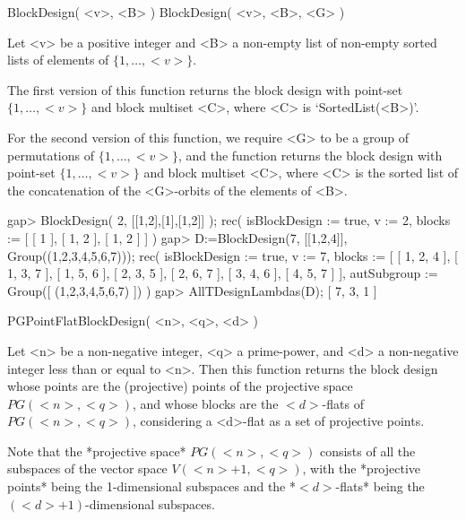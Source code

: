 %
%
%
%
\def\DESIGN{\sf DESIGN}
\def\GRAPE{\sf GRAPE}
\def\nauty{\it nauty}
\def\Aut{{\rm Aut}\,}
\def\lcm{{\rm lcm}\,}
\def\x{\times}


\>BlockDesign( <v>, <B> )
\>BlockDesign( <v>, <B>, <G> )

Let <v> be a positive integer and <B> a non-empty list of non-empty
sorted lists of elements of $\{1,\ldots,<v>\}$.

The first version of this function returns the block design with point-set
$\{1,\ldots,<v>\}$ and block multiset <C>, where <C> is `SortedList(<B>)'.

For the second version of this function, we require <G> to be a group
of permutations of $\{1,\ldots,<v>\}$, and the function returns the
block design with point-set $\{1,\ldots,<v>\}$ and block multiset <C>,
where <C> is the sorted list of the concatenation of the <G>-orbits of
the elements of <B>.

\beginexample
gap> BlockDesign( 2, [[1,2],[1],[1,2]] );
rec( isBlockDesign := true, v := 2, blocks := [ [ 1 ], [ 1, 2 ], [ 1, 2 ] ] )
gap> D:=BlockDesign(7, [[1,2,4]], Group((1,2,3,4,5,6,7)));
rec( isBlockDesign := true, v := 7, 
  blocks := [ [ 1, 2, 4 ], [ 1, 3, 7 ], [ 1, 5, 6 ], [ 2, 3, 5 ], 
      [ 2, 6, 7 ], [ 3, 4, 6 ], [ 4, 5, 7 ] ], 
  autSubgroup := Group([ (1,2,3,4,5,6,7) ]) )
gap> AllTDesignLambdas(D);
[ 7, 3, 1 ]
\endexample



\>PGPointFlatBlockDesign( <n>, <q>, <d> )

Let <n> be a non-negative integer, <q> a prime-power, and <d> a
non-negative integer less than or equal to <n>. Then this function
returns the block design whose points are the (projective) points of
the projective space $PG(<n>,<q>)$, and whose blocks are the $<d>$-flats
of $PG(<n>,<q>)$, considering a <d>-flat as a set of projective points.

Note that the *projective space* $PG(<n>,<q>)$ consists of all the
subspaces of the vector space $V(<n>+1,<q>)$, with the *projective
points* being the 1-dimensional subspaces and the *$<d>$-flats* being
the $(<d>+1)$-dimensional subspaces.

